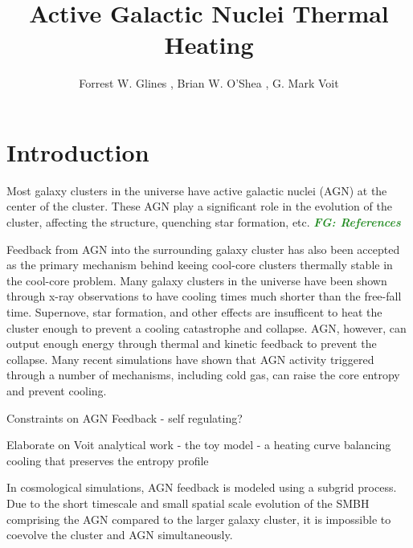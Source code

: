 \documentclass[iop,apjl, twocolappendix]{emulateapj}   %
\def\FG#1{{\textcolor{ForestGreen}{\textbf{\textit{ FG: #1}}}}}
\begin{document}
\title{Active Galactic Nuclei Thermal Heating}

\author{
  Forrest W. Glines , Brian W. O'Shea , G. Mark Voit
}


\label{firstpage}

\begin{abstract}
\end{abstract}

\keywords{}

\section{Introduction}
\label{sec:introduction}

Most galaxy clusters in the universe have active galactic nuclei (AGN) at the
center of the cluster. These AGN play a significant role in the evolution of
the cluster, affecting the structure, quenching star formation, etc. \FG{References}

Feedback from AGN into the surrounding galaxy cluster has also been accepted as
the primary mechanism behind keeing cool-core clusters thermally stable in the
cool-core problem. Many galaxy clusters in the universe have been shown through
x-ray observations to have cooling times much shorter than the free-fall time.
Supernove, star formation, and other effects are insufficent to heat the
cluster enough to prevent a cooling catastrophe and collapse. AGN, however, can
output enough energy through thermal and kinetic feedback to prevent the
collapse. Many recent simulations have shown that AGN activity triggered
through a number of mechanisms, including cold gas, can raise the core entropy
and prevent cooling.

\textbullet Constraints on AGN Feedback - self regulating?

\textbullet Elaborate on Voit analytical work - the toy model - a heating curve balancing
cooling that preserves the entropy profile

In cosmological simulations, AGN feedback is modeled using a subgrid process.
Due to the short timescale and small spatial scale evolution of the SMBH
comprising the AGN compared to the larger galaxy cluster, it is impossible to
coevolve the cluster and AGN simultaneously.
\end{document}
